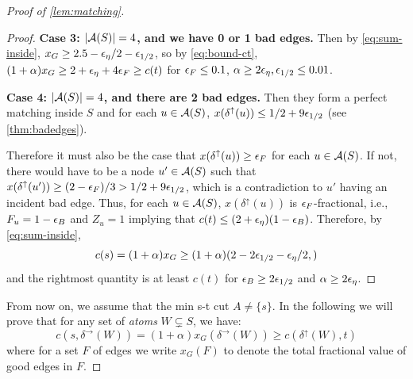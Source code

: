 \begin{proof}[Proof of \cref{lem:matching}]
\begin{proof}
\textbf{Case 3: $|{\cal A}(S)|=4$, and we have 0 or 1 bad edges.} Then by \cref{eq:sum-inside}, $x_G\geq 2.5-{\epsilon}_\eta /2 - {\epsilon}_{1/2}$, so by \cref{eq:bound-ct}, $(1+\alpha)x_G \geq 2+{\epsilon}_\eta + 4{\epsilon}_F \ge c(t)$ for ${\epsilon}_F \le 0.1$, $\alpha \ge 2{\epsilon}_\eta, {\epsilon}_{1/2} \le 0.01$. %


\textbf{Case 4: $|{\cal A}(S)|=4$, and there are 2 bad edges.}
Then they form a perfect matching inside $S$ and  for each
$u\in{\cal A}(S)$, $x(\delta^\uparrow(u))\le 1/2 + 9{\epsilon}_{1/2}$ (see \cref{thm:badedges}).

Therefore it must also be the case that $x(\delta^\uparrow(u))\ge  {\epsilon}_F$ for each $u\in{\cal A}(S)$. If not,  there would have to be a node $u' \in {\cal A}(S)$ such that
$x(\delta^\uparrow(u')) \ge (2- {\epsilon}_F)/3 > 1/2 + 9{\epsilon}_{1/2}$,
which is a contradiction to $u'$ having an incident bad edge.
Thus, for each $u \in {\cal A}(S)$, $x(\delta^\uparrow(u))$ is ${\epsilon}_F$-fractional, i.e., $F_u=1-{\epsilon}_B$ and $Z_u=1$ implying that 
 $c(t) \le (2 + {\epsilon}_\eta)(1- {\epsilon}_B)$.
 Therefore, by \cref{eq:sum-inside},
 $$c(s) = (1+ \alpha) x_G \ge (1+ \alpha) (2-2{\epsilon}_{1/2} - {\epsilon}_\eta/2,)$$ 
 and the rightmost quantity is at least $c(t)$ for ${\epsilon}_B \ge 2 {\epsilon}_{1/2}$ and $\alpha \ge 2 {\epsilon}_\eta$.
\end{proof}




From now on, we assume that the min s-t cut $A\neq \{s\}$. In the following we will prove that for any set of \textit{atoms} $W \subsetneq S$, we have:
\begin{equation}\label{eq:goalTdeltarigthup}
 c(s,\delta^\rightarrow(W))  = (1+\alpha) x_G(\delta^\rightarrow(W)) \geq c(\delta^\uparrow(W),t) 
\end{equation}
where for a set $F$ of edges we write $x_G(F)$ to denote the total fractional value of good edges in $F$.


\end{proof}
